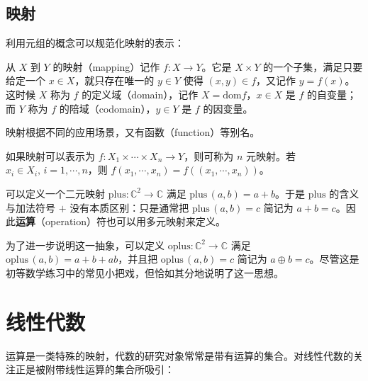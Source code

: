 \documentclass[cn,10pt,math=newtx,citestyle=gb7714-2015,bibstyle=gb7714-2015]{elegantbook}
\def\C{\mathbb C}
\def\ra{\rightarrow}
\begin{document}
\section{映射}
利用元组的概念可以规范化映射的表示：
\begin{definition}[映射]
   从 $X$ 到 $Y$ 的映射（mapping）记作 $f:X\ra Y$。它是 $X\times Y$ 的一个子集，满足只要给定一个 $x\in X$，就只存在唯一的 $y\in Y$ 使得 $(x,y)\in f$，又记作 $y=f(x)$。这时候 $X$ 称为 $f$ 的定义域（domain），记作 $X=\text{dom} f$，$x\in X$ 是 $f$ 的自变量；而 $Y$ 称为 $f$ 的陪域（codomain），$y\in Y$ 是 $f$ 的因变量。
\end{definition}
映射根据不同的应用场景，又有函数（function）等别名。
\begin{definition}[多元映射]
   如果映射可以表示为 $f:X_1\times\cdots\times X_n\ra Y$，则可称为 $n$ 元映射。若 $x_i\in X_i,\,i=1,\cdots,n$，则 $f(x_1,\cdots,x_n)=f((x_1,\cdots,x_n))$。
\end{definition}
\begin{instance}
可以定义一个二元映射 $\text{plus}:\C^2\ra \C$ 满足 $\text{plus}\,(a,b)=a+b$。于是 $\text{plus}$ 的含义与加法符号 $+$ 没有本质区别：只是通常把 $\text{plus}\,(a,b)=c$ 简记为 $a+b=c$。因此\textbf{运算}（operation）符也可以用多元映射来定义。
\end{instance}
\begin{instance}
为了进一步说明这一抽象，可以定义 $\text{oplus}:\C^2\ra \C$ 满足 $\text{oplus}\,(a,b)=a+b+ab$，并且把 $\text{oplus}\,(a,b)=c$ 简记为 $a\oplus b=c$。尽管这是初等数学练习中的常见小把戏，但恰如其分地说明了这一思想。
\end{instance}


\chapter{线性代数}
运算是一类特殊的映射，代数的研究对象常常是带有运算的集合。对线性代数的关注正是被附带线性运算的集合所吸引：
\end{document}
